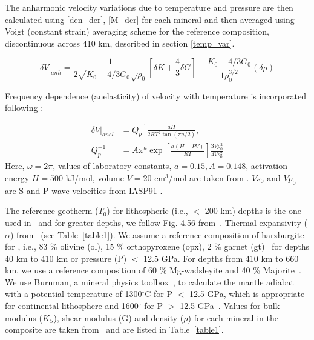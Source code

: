 \documentclass[draft,linenumbers]{agujournal2018}
\begin{document}
The anharmonic velocity variations due to temperature and pressure are then calculated using \ref{den_der}, \ref{M_der} for each mineral and then averaged using Voigt (constant strain) averaging scheme for the reference composition, discontinuous across 410 km,  described in section \ref{temp_var}.

\begin{equation} \label{anh}
    \delta V \vert_{anh} = \frac{1}{2\sqrt{K_0 + 4/3 G_0} \sqrt{\rho_0}} \left[\delta K + \frac{4}{3} \delta G \right] - \frac{K_0 + 4/3 G_0}{1\rho_0^{3/2}} ( \delta \rho)
\end{equation} 

Frequency dependence (anelasticity) of velocity with temperature is incorporated following \citet{Goes_2000}:

\begin{align} \label{anel}
    \delta V \vert_{anel} &= Q_p^{-1} \frac{aH}{2 R T^2 \tan(\pi a/2)},\\
    Q_p^{-1} &= A \omega^{a} \exp \left[ \frac{a(H+PV)}{RT} \right] \frac{3Vp_{0}^{2}}{4Vs_{0}^{2}} \nonumber
\end{align}
Here, $\omega = 2\pi $, values of laboratory constants, $a = 0.15, A = 0.148$, activation energy $H = 500$ kJ/mol, volume $V = 20$ cm$^3$/mol are taken from \citet{sobolev1996upper}. $Vs_0$ and $Vp_0$ are S and P wave velocities from IASP91 \citep{kennett1991traveltimes}.

The reference geotherm ($T_0$) for lithospheric (i.e., $<$ 200 km) depths is the one used in~\citep{Goes_2002} and for greater depths, we follow Fig. 4.56 from~\citet{turcotte2014geodynamics}. Thermal expansivity ($\alpha$) from~\citet{saxena_data} (see Table~\ref{table1}). We assume a reference composition of harzburgite for , i.e., 83 \% olivine (ol), 15 \% orthopyroxene (opx), 2 \% garnet (gt)~\citep{mcdonough1998mineralogy} for depths 40 km to 410 km or pressure (P) $<$ 12.5 GPa. For depths from 410 km to 660 km, we use a reference composition of 60 \% Mg-wadsleyite and 40 \% Majorite~\citep{haggerty1995upper}. We use Burnman, a mineral physics toolbox~\citep{cottaar2014burnman}, to calculate the mantle adiabat with a potential temperature of 1300$^{\circ}$C for P $<$ 12.5 GPa, which is appropriate for continental lithosphere \citep{rudnick1998thermal} and 1600$^{\circ}$ for P $>$ 12.5 GPa~\citep{katsura2010adiabatic}. Values for bulk modulus ($K_S$), shear modulus (G) and density ($\rho$) for each mineral in the composite are taken from~\citet{Cammarano2003} and are listed in Table~\ref{table1}.
\end{document}
